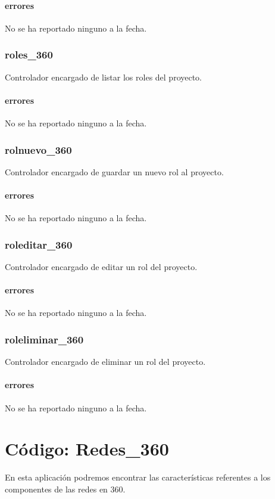 \documentclass[10pt,a4paper]{book}
\begin{document}
	\subsubsection{errores}
	No se ha reportado ninguno a la fecha.

	\subsection{roles\_360}
	Controlador encargado de listar los roles del proyecto.
	\subsubsection{errores}
	No se ha reportado ninguno a la fecha.

	\subsection{rolnuevo\_360}
	Controlador encargado de guardar un nuevo rol al proyecto.
	\subsubsection{errores}
	No se ha reportado ninguno a la fecha.

	\subsection{roleditar\_360}
	Controlador encargado de editar un rol del proyecto.
	\subsubsection{errores}
	No se ha reportado ninguno a la fecha.

	\subsection{roleliminar\_360}
	Controlador encargado de eliminar un rol del proyecto.
	\subsubsection{errores}
	No se ha reportado ninguno a la fecha.


	\chapter{Código: Redes\_360}

	En esta aplicación podremos encontrar las características referentes a los componentes de las redes en 360.
\end{document}
